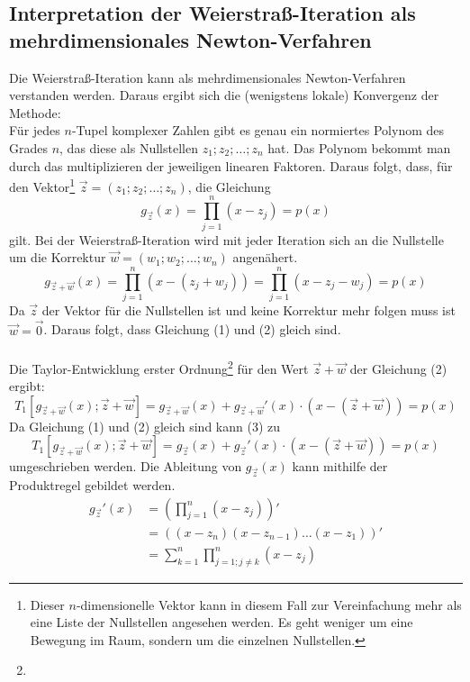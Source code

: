 \documentclass[12pt]{article}
\begin{document}
\subsection{Interpretation der Weierstraß-Iteration als mehrdimensionales Newton-Verfahren}
Die Weierstraß-Iteration kann als mehrdimensionales Newton-Verfahren verstanden werden. Daraus ergibt sich die (wenigstens lokale) Konvergenz der Methode: \\
Für jedes $n$-Tupel komplexer Zahlen gibt es genau ein normiertes Polynom des Grades $n$, das diese als Nullstellen $z_1;z_2;\dots;z_n$ hat. Das Polynom bekommt man durch das multiplizieren der jeweiligen linearen Faktoren. Daraus folgt, dass, für den Vektor\footnote{Dieser $n$-dimensionelle Vektor kann in diesem Fall zur Vereinfachung mehr als eine Liste der Nullstellen angesehen werden. Es geht weniger um eine Bewegung im Raum, sondern um die einzelnen Nullstellen.} $\vec{z} = (z_1;z_2;\dots;z_n)$, die Gleichung
\begin{equation}
    g_{\vec{z}}(x)=\prod_{j=1}^{n}(x-z_j)=p(x)
\end{equation}
gilt. Bei der Weierstraß-Iteration wird mit jeder Iteration sich an die Nullstelle um die Korrektur $\vec{w} = (w_1;w_2;\dots;w_n)$ angenähert.
\begin{equation}
    g_{\vec{z} + \vec{w}}(x)=\prod_{j=1}^{n}(x-(z_j+w_j))=\prod_{j=1}^{n}(x-z_j-w_j)=p(x)
\end{equation}
Da $\vec{z}$ der Vektor für die Nullstellen ist und keine Korrektur mehr folgen muss ist $\vec{w} = \vec{0}$. Daraus folgt, dass Gleichung (1) und (2) gleich sind. \\\\
Die Taylor-Entwicklung erster Ordnung\footnote{} für den Wert $\vec{z} + \vec{w}$ der Gleichung (2) ergibt:
\begin{equation}
    T_1[g_{\vec{z} + \vec{w}}(x);\vec{z} + \vec{w}] = g_{\vec{z} + \vec{w}}(x)+g_{\vec{z} + \vec{w}}'(x)\cdot (x-(\vec{z}+\vec{w})) = p(x)
\end{equation}
Da Gleichung (1) und (2) gleich sind kann (3) zu
\begin{equation}
    T_1[g_{\vec{z} + \vec{w}}(x);\vec{z} + \vec{w}] = g_{\vec{z}}(x)+g_{\vec{z}}'(x)\cdot (x-(\vec{z}+\vec{w})) = p(x)
\end{equation}
umgeschrieben werden. Die Ableitung von $g_{\vec{z}}(x)$ kann mithilfe der Produktregel gebildet werden.
\begin{align*}
    g_{\vec{z}}'(x) &= (\prod_{j=1}^{n}(x-z_j))' \\
                    &= ((x-z_n)(x-z_{n-1})\dots(x-z_1))' \\
                    &= \sum_{k=1}^{n}\prod_{j=1;j\neq k}^{n}(x-z_j)
\end{align*}
\end{document}
